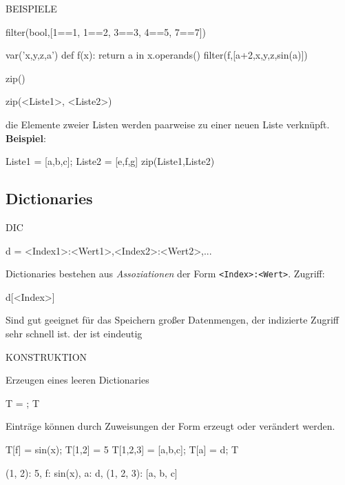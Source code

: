 \documentclass[fontsize=12pt,paper=a4,twoside,bibtotoc,idxtotoc,
liststotoc,pagesize,BCOR1.2cm,DIV15,chapterprefix,pagesize=pdftex]{scrbook}
\theoremstyle{plain}
\theoremstyle{definition}
\theoremstyle{remark}
\begin{document}
BEISPIELE

\begin{sagein}
 filter(bool,[1==1, 1==2, 3==3, 4==5, 7==7])
 \end{sagein}
 \begin{sage}
 \end{sage}
\begin{sagein}
var('x,y,z,a')
def f(x): return a in x.operands()
filter(f,[a+2,x,y,z,sin(a)])
\end{sagein}
\begin{sage}
  [a + 2, sin(a)]
\end{sage}

zip()

\begin{sagein}
zip(<Liste1>, <Liste2>) 
\end{sagein}
die Elemente zweier Listen werden paarweise zu einer neuen Liste verknüpft.\\
\textbf{Beispiel}:
\begin{sagein}
Liste1 = [a,b,c]; Liste2 = [e,f,g]
zip(Liste1,Liste2)
\end{sagein}
\begin{sage}
[(a, e), (b, f), (c, g)]
\end{sage}

\subsection{Dictionaries}
DIC

\begin{sagein}
d = {<Index1>:<Wert1>,<Index2>:<Wert2>,...}
\end{sagein}


 Dictionaries bestehen aus \emph{Assoziationen} der Form \verb+<Index>:<Wert>+. 
 Zugriff:
\begin{sagein}
d[<Index>]
\end{sagein}
  Sind gut geeignet für das Speichern großer Datenmengen, der indizierte Zugriff sehr schnell ist.
 der  ist eindeutig


KONSTRUKTION


 Erzeugen eines leeren Dictionaries
\begin{sagein}
T = {}; T
\end{sagein}
\begin{sage}
  {}
\end{sage}
 Einträge können durch Zuweisungen der Form  erzeugt oder verändert werden. 
\begin{sagein}
T[f] = sin(x); T[1,2] = 5
T[1,2,3] = [a,b,c]; T[a] = d;
T
\end{sagein}
\begin{sage}
{(1, 2): 5, f: sin(x), a: d, (1, 2, 3): [a, b, c]}
\end{sage}
\end{document}
